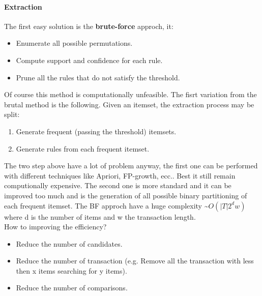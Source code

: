 \documentclass[12pt]{article}
\begin{document}
\paragraph{Extraction} The first easy solution is the \textbf{brute-force} approch, it:
\begin{itemize}
  \item Enumerate all possible permutations.
  \item Compute support and confidence for each rule.
  \item Prune all the rules that do not satisfy the threshold.
\end{itemize}
Of course this method is computationally unfeasible. The fisrt variation from the brutal method is the following. Given an itemset, the extraction process may be split:
\begin{enumerate}
  \item Generate frequent (passing the threshold) itemsets.
  \item Generate rules from each frequent itemset.
\end{enumerate}
The two step above have a lot of problem anyway, the first one can be performed with different techniques like Apriori, FP-growth, ecc.. Best it still remain computionally expensive. The second one is more standard and it can be improved too much and is the generation of all possible binary partitioning of each frequent itemset. The BF approch have a huge complexity \textasciitilde $ O(|T| 2^d w)$ where d is the number of items and w the transaction length.\\
How to improving the efficiency?
\begin{itemize}
  \item Reduce the number of candidates.
  \item Reduce the number of transaction (e.g. Remove all the transaction with less then x items searching for y items).
  \item Reduce the number of comparisons.
\end{itemize}
\end{document}
